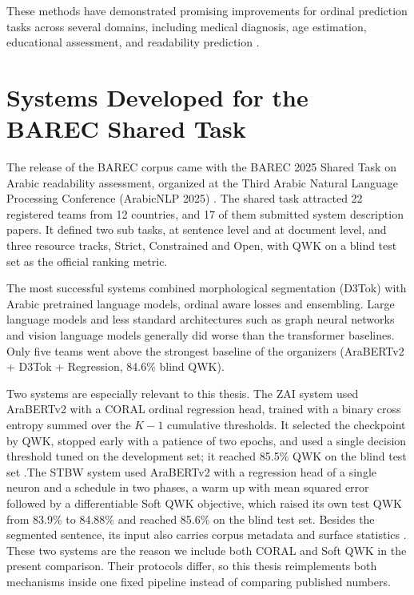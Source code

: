 \documentclass[12pt]{report}
\begin{document}
These methods have demonstrated promising improvements for ordinal prediction tasks across several domains, including medical diagnosis, age estimation, educational assessment, and readability prediction \cite{castagnos2022ordinal}.
\section{Systems Developed for the BAREC Shared Task}

The release of the BAREC corpus came with the BAREC 2025 Shared Task on Arabic readability assessment, organized at the Third Arabic Natural Language Processing Conference (ArabicNLP 2025) \cite{elmadani2025sharedtask}. The shared task attracted 22 registered teams from 12 countries, and 17 of them submitted system description papers. It defined two sub tasks, at sentence level and at document level, and three resource tracks, Strict, Constrained and Open, with QWK on a blind test set as the official ranking metric.

The most successful systems combined morphological segmentation (D3Tok) with Arabic pretrained language models, ordinal aware losses and ensembling. Large language models and less standard architectures such as graph neural networks and vision language models generally did worse than the transformer baselines. Only five teams went above the strongest baseline of the organizers (AraBERTv2 + D3Tok + Regression, 84.6\% blind QWK).

Two systems are especially relevant to this thesis. The ZAI system used AraBERTv2 with a CORAL ordinal regression head, trained with a binary cross entropy summed over the $K{-}1$ cumulative thresholds. It selected the checkpoint by QWK, stopped early with a patience of two epochs, and used a single decision threshold tuned on the development set; it reached 85.5\% QWK on the blind test set \cite{nazzal2025zai}.The STBW system used AraBERTv2 with a regression head of a single neuron and a schedule in two phases, a warm up with mean squared error followed by a differentiable Soft QWK objective, which raised its own test QWK from 83.9\% to 84.88\% and reached 85.6\% on the blind test set. Besides the segmented sentence, its input also carries corpus metadata and surface statistics \cite{trigui2025stbw}. These two systems are the reason we include both CORAL and Soft QWK in the present comparison. Their protocols differ, so this thesis reimplements both mechanisms inside one fixed pipeline instead of comparing published numbers.
\end{document}
